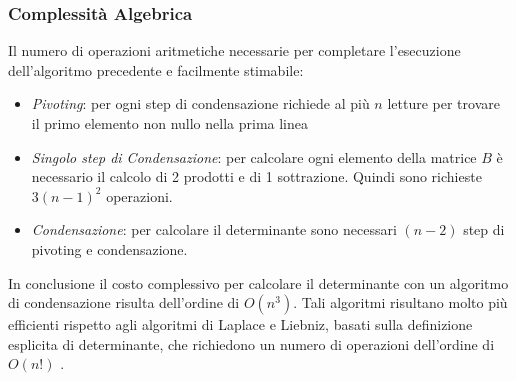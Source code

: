 \documentclass{article}
\begin{document}
\subsubsection{Complessità Algebrica}
Il numero di operazioni aritmetiche necessarie per completare l'esecuzione dell'algoritmo precedente e facilmente stimabile:
\begin{itemize}
\item \textit{Pivoting}: per ogni step di condensazione richiede al più $n$ letture per trovare il primo elemento non nullo nella prima linea

\item \textit{Singolo step di Condensazione}: per calcolare ogni elemento della matrice $B$ è necessario il calcolo di 2 prodotti e di 1 sottrazione. Quindi sono richieste $3(n-1)^{2}$ operazioni.

\item \textit{Condensazione}: per calcolare il determinante sono necessari $(n-2)$ step di pivoting e condensazione. 

\end{itemize}
In conclusione il costo complessivo per calcolare il determinante con un algoritmo di condensazione risulta dell'ordine di $O(n^{3})$.
Tali algoritmi risultano molto più efficienti rispetto agli algoritmi di Laplace e Liebniz, basati sulla definizione esplicita di determinante, che richiedono un numero di operazioni dell'ordine di $O(n!)$ . 
\end{document}
